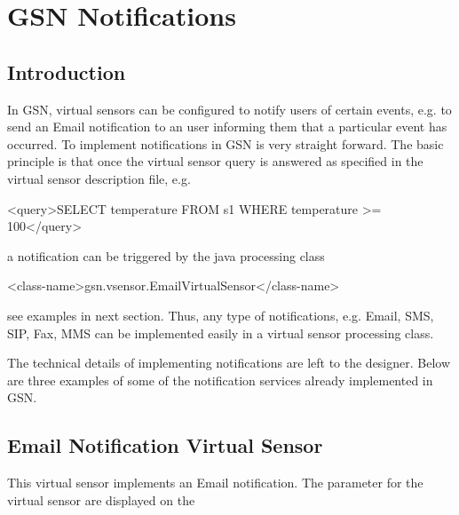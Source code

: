 \section{GSN Notifications}

\subsection{Introduction}

In GSN, virtual sensors can be configured to notify users of certain events, e.g. to send an Email notification to an user informing them that a particular event has occurred. To implement notifications in GSN is very straight forward. The basic principle is that once the virtual sensor query is answered as specified in the virtual sensor description file, e.g.

\begin{xmlcode}
<query>SELECT temperature FROM s1 WHERE temperature >= 100</query>
\end{xmlcode}

a notification can be triggered  by the java processing class

\begin{xmlcode}
<class-name>gsn.vsensor.EmailVirtualSensor</class-name>
\end{xmlcode}

see examples in next section. Thus, any type of notifications, e.g. Email, SMS, SIP, Fax, MMS can be implemented easily in a virtual sensor processing class. 

The technical details of implementing notifications are left to the designer. Below are three examples of some of the notification services already implemented in GSN.

\subsection{Email Notification Virtual Sensor}

This virtual sensor implements an Email notification. The parameter for the virtual sensor are displayed on the 

